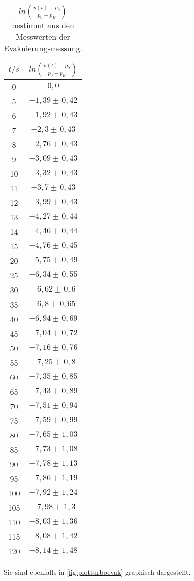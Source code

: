 \begin{table}[H]
  \centering
  \begin{tabular}{c|c}
    $t/s$ & $ln(\frac{p(t)-p_0}{p_0 - p_E})$ \\
    \midrule
    0     & $ 0,0 $ \\
    5     & $ -1,39  \pm \,  0,42 $ \\
    6     & $ -1,92  \pm \,  0,43 $ \\
    7     & $ -2,3   \pm \,  0,43 $ \\
    8     & $ -2,76  \pm \,  0,43 $ \\
    9     & $ -3,09  \pm \,  0,43 $ \\
    10    & $ -3,32  \pm \,  0,43 $ \\
    11    & $ -3,7   \pm \,  0,43 $ \\
    12    & $ -3,99  \pm \,  0,43 $ \\
    13    & $ -4,27  \pm \,  0,44 $ \\
    14    & $ -4,46  \pm \,  0,44 $ \\
    15    & $ -4,76  \pm \,  0,45 $ \\
    20    & $ -5,75  \pm \,  0,49 $ \\
    25    & $ -6,34  \pm \,  0,55 $ \\
    30    & $ -6,62  \pm \,  0,6 $ \\
    35    & $ -6,8   \pm \,  0,65 $ \\
    40    & $ -6,94  \pm \,  0,69 $ \\
    45    & $ -7,04  \pm \,  0,72 $ \\
    50    & $ -7,16  \pm \,  0,76 $ \\
    55    & $ -7,25  \pm \,  0,8 $ \\
    60    & $ -7,35  \pm \,  0,85 $ \\
    65    & $ -7,43  \pm \,  0,89 $ \\
    70    & $ -7,51  \pm \,  0,94 $ \\
    75    & $ -7,59  \pm \,  0,99 $ \\
    80    & $ -7,65  \pm \,  1,03 $ \\
    85    & $ -7,73  \pm \,  1,08 $ \\
    90    & $ -7,78  \pm \,  1,13 $ \\
    95    & $ -7,86  \pm \,  1,19 $ \\
    100   & $ -7,92  \pm \,  1,24 $ \\
    105   & $ -7,98  \pm \,  1,3 $ \\
    110   & $ -8,03  \pm \,  1,36 $ \\
    115   & $ -8,08  \pm \,  1,42 $ \\
    120   & $ -8,14  \pm \,  1,48 $ \\
    \bottomrule
  \end{tabular}
  \caption{$ln(\frac{p(t)-p_0}{p_0 - p_E})$ bestimmt aus den Messwerten der Evakuierungsmessung.}
  \label{tab:ln1}
\end{table}
\noindent
Sie sind ebenfalls in \autoref{fig:plotturboevak} graphisch dargestellt.

